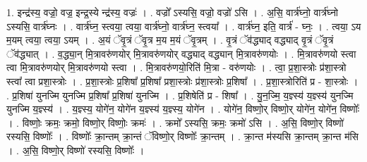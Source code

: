 \documentclass[17pt]{extarticle}
\begin{document}
1. इन्द्र॑स्य॒ वज्रो॒ वज्र॒ इन्द्र॒स्ये न्द्र॑स्य॒ वज्रः॑ । . वज्रो᳚ ऽस्यसि॒ वज्रो॒ वज्रो॑ ऽसि । . अ॒सि॒ वार्त्र॑घ्नो॒ वार्त्र॑घ्नो ऽस्यसि॒ वार्त्र॑घ्नः । . वार्त्र॑घ्न॒ स्त्वया॒ त्वया॒ वार्त्र॑घ्नो॒ वार्त्र॑घ्न॒ स्त्वया᳚ । . वार्त्र॑घ्न॒ इति॒ वार्त्र॑ - घ्नः॒ । . त्वया॒ ऽय म॒यम् त्वया॒ त्वया॒ ऽयम् । . अ॒यं ॅवृ॒त्रं ॅवृ॒त्र म॒य म॒यं ॅवृ॒त्रम् । . वृ॒त्रं ॅव॑द्ध्याद् वद्ध्याद् वृ॒त्रं ॅवृ॒त्रं ॅव॑द्ध्यात् । . व॒द्ध्या॒न् मि॒त्रावरु॑णयोर् मि॒त्रावरु॑णयोर् वद्ध्याद् वद्ध्यान् मि॒त्रावरु॑णयोः । . मि॒त्रावरु॑णयो स्त्वा त्वा मि॒त्रावरु॑णयोर् मि॒त्रावरु॑णयो स्त्वा । . मि॒त्रावरु॑णयो॒रिति॑ मि॒त्रा - वरु॑णयोः । . त्वा॒ प्र॒शा॒स्त्रोः प्र॑शा॒स्त्रो स्त्वा᳚ त्वा प्रशा॒स्त्रोः । . प्र॒शा॒स्त्रोः प्र॒शिषा᳚ प्र॒शिषा᳚ प्रशा॒स्त्रोः प्र॑शा॒स्त्रोः प्र॒शिषा᳚ । . प्र॒शा॒स्त्रोरिति॑ प्र - शा॒स्त्रोः । . प्र॒शिषा॑ युनज्मि युनज्मि प्र॒शिषा᳚ प्र॒शिषा॑ युनज्मि । . प्र॒शिषेति॑ प्र - शिषा᳚ । . यु॒न॒ज्मि॒ य॒ज्ञ्स्य॑ य॒ज्ञ्स्य॑ युनज्मि युनज्मि य॒ज्ञ्स्य॑ । . य॒ज्ञ्स्य॒ योगे॑न॒ योगे॑न य॒ज्ञ्स्य॑ य॒ज्ञ्स्य॒ योगे॑न । . योगे॑न॒ विष्णो॒र् विष्णो॒र् योगे॑न॒ योगे॑न॒ विष्णोः᳚ । . विष्णोः॒ क्रमः॒ क्रमो॒ विष्णो॒र् विष्णोः॒ क्रमः॑ । . क्रमो᳚ ऽस्यसि॒ क्रमः॒ क्रमो॑ ऽसि । . अ॒सि॒ विष्णो॒र् विष्णो॑ रस्यसि॒ विष्णोः᳚ । . विष्णोः᳚ क्रा॒न्तम् क्रा॒न्तं ॅविष्णो॒र् विष्णोः᳚ क्रा॒न्तम् । . क्रा॒न्त म॑स्यसि क्रा॒न्तम् क्रा॒न्त म॑सि । . अ॒सि॒ विष्णो॒र् विष्णो॑ रस्यसि॒ विष्णोः᳚ । \newline
\end{document}
